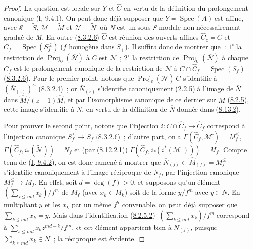 \begin{proof}
La question est locale sur $Y$ et $\widehat{C}$ en vertu de la définition du
prolongement canonique (\hyperref[I.9.4.1-fr]{I, 9.4.1}). On peut donc déjà
supposer que $Y=\operatorname{Spec}(A)$ est affine, avec
$\mathcal{S}=\widetilde{S}$, $\mathcal{M}=\widetilde{M}$ et
$\mathcal{N}=\widetilde{N}$, où $N$ est un sous-$S$-module non
nécessairement gradué de $M$. En outre
(\hyperref[II.8.3.2.6-fr]{8.3.2.6}) $\widehat{C}$ est réunion des ouverts
affines $\widehat{C}_z=C$ et
$\widehat{C}_f=\operatorname{Spec}(S_f^{\leq})$ ($f$ homogène dans $S_+$).
Il suffira donc de montrer que~: $1^\circ$ la restriction de
$\operatorname{Proj}_0(\overline{\mathcal{N}})$ à $C$ est
$\widetilde{\mathcal{N}}$~; $2^\circ$ la restriction de
$\operatorname{Proj}_0(\overline{\mathcal{N}})$ à chaque $\widehat{C}_f$ est
le prolongement canonique de la restriction de $\mathcal{N}$ à
$C\cap\widehat{C}_f=\operatorname{Spec}(S_f)$
(\hyperref[II.8.3.2.6-fr]{8.3.2.6}). Pour le premier point, notons que
$\operatorname{Proj}_0(\overline{\mathcal{N}})|C$ s'identifie à
$(\overline{N}_{(z)})^{\sim}$
(\hyperref[II.8.3.2.4-fr]{8.3.2.4})~; or $\overline{N}_{(z)}$ s'identifie
canoniquement (\hyperref[II.2.2.5-fr]{2.2.5}) à l'image de
$\overline{N}$ dans $\widehat{M}/(z-1)\widehat{M}$, et par l'isomorphisme
canonique de ce dernier sur $M$ (\hyperref[II.8.2.5-fr]{8.2.5}), cette image
s'identifie à $N$, en vertu de la définition de $\overline{N}$ donnée dans
(\hyperref[II.8.13.2-fr]{8.13.2}).

Pour prouver le second point, notons que l'injection
$i:C\cap\widehat{C}_f\to\widehat{C}_f$ correspond à l'injection canonique
$S_f^{\leq}\to S_f$ (\hyperref[II.8.3.2.6-fr]{8.3.2.6})~; d'autre part, on
a $\Gamma(\widehat{C}_f,\mathcal{M}^{\square})=M_f^{\leq}$,
$\Gamma(\widehat{C}_f,i_*(\widetilde{\mathcal{N}}))=N_f$ et (par
(\hyperref[II.8.12.2.1-fr]{8.12.2.1}))
$\Gamma(\widehat{C}_f,i_*(i^*(\mathcal{M}^{\square})))=M_f$. Compte tenu de
(\hyperref[I.9.4.2-fr]{I, 9.4.2}), on est donc ramené à montrer que
$\overline{N}_{(f)}\subset\widehat{M}_{(f)}=M_f^{\leq}$ s'identifie
canoniquement à l'image réciproque de $N_f$, par l'injection canonique
$M_f^{\leq}\to M_f$. En effet, soit $d=\deg(f)>0$, et supposons qu'un
élément $(\sum_{k\leqslant md}x_k)/f^m$ de $M_f$ (avec $x_k\in M_k$) soit de
la forme $y/f^m$ avec $y\in N$. En multipliant $y$ et les $x_k$ par un même
$f^h$ convenable, on peut déjà supposer que $\sum_{k\leqslant md}x_k=y$.
Mais dans l'identification (\hyperref[II.8.2.5.2-fr]{8.2.5.2}),
$(\sum_{k\leqslant md}x_k)/f^m$ correspond à
$\sum_{k\leqslant md}x_kz^{md-k}/f^m$, et cet élément appartient bien à
$\overline{N}_{(f)}$, puisque $\sum_{k\leqslant md}x_k\in N$~; la réciproque
est évidente.
\end{proof}

